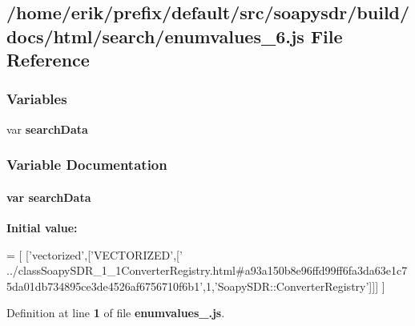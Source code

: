 \subsection{/home/erik/prefix/default/src/soapysdr/build/docs/html/search/enumvalues\+\_\+6.js File Reference}
\label{enumvalues__6_8js}
\subsubsection*{Variables}
\begin{DoxyCompactItemize}
\item 
var {\bf search\+Data}
\end{DoxyCompactItemize}


\subsubsection{Variable Documentation}
\paragraph[{search\+Data}]{\setlength{\rightskip}{0pt plus 5cm}var search\+Data}\label{enumvalues__6_8js_ad01a7523f103d6242ef9b0451861231e}
{\bfseries Initial value\+:}
\begin{DoxyCode}
=
[
  [\textcolor{stringliteral}{'vectorized'},[\textcolor{stringliteral}{'VECTORIZED'},[\textcolor{stringliteral}{'
      ../classSoapySDR\_1\_1ConverterRegistry.html#a93a150b8e96ffd99ff6fa3da63e1c75da01db734895ce3de4526af6756710f6b1'},1,\textcolor{stringliteral}{'SoapySDR::ConverterRegistry'}]]]
]
\end{DoxyCode}


Definition at line {\bf 1} of file {\bf enumvalues\+\_.\+js}.


